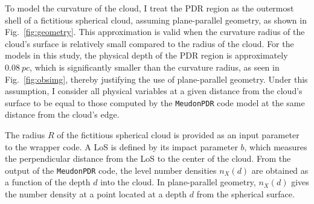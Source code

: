 \documentclass[12pt,a4paper]{article}
\newcommand{\mdpdr}{\texttt{MeudonPDR} code}
\begin{document}
To model the curvature of the cloud, I treat the PDR region as the outermost shell of a fictitious spherical cloud, assuming plane-parallel geometry, as shown in Fig.~\ref{fig:geometry}. This approximation is valid when the curvature radius of the cloud's surface is relatively small compared to the radius of the cloud. For the models in this study, the physical depth of the PDR region is approximately $\qty{0.08}{pc}$, which is significantly smaller than the curvature radius, as seen in Fig.~\ref{fig:obsimg}, thereby justifying the use of plane-parallel geometry. Under this assumption, I consider all physical variables at a given distance from the cloud's surface to be equal to those computed by the \mdpdr{} model at the same distance from the cloud's edge.

The radius $R$ of the fictitious spherical cloud is provided as an input parameter to the wrapper code. A LoS is defined by its impact parameter $b$, which measures the perpendicular distance from the LoS to the center of the cloud. From the output of the \mdpdr{}, the level number densities $n_X(d)$ are obtained as a function of the depth $d$ into the cloud. In plane-parallel geometry, $n_X(d)$ gives the number density at a point located at a depth $d$ from the spherical surface. 
\end{document}
